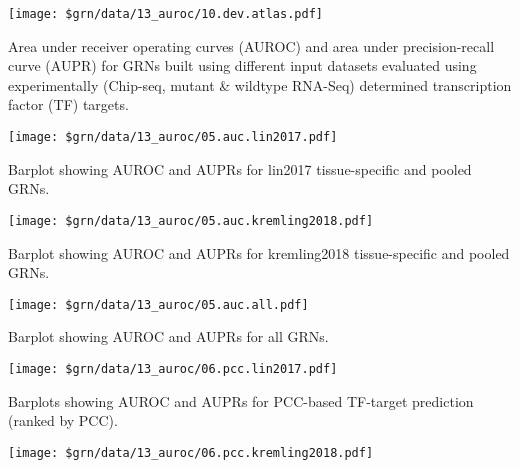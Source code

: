 \documentclass[11pt,]{article}
\let\origfigure\figure
\let\endorigfigure\endfigure
\renewenvironment{figure}[1][2] {
    \expandafter\origfigure\expandafter[H]
} {
    \endorigfigure
}
\begin{document}
\pagebreak

\begin{figure}
\centering
\texttt{[image: \$grn/data/13\_auroc/10.dev.atlas.pdf]}
\caption{Fig 1}
\end{figure}

Area under receiver operating curves (AUROC) and area under
precision-recall curve (AUPR) for GRNs built using different input
datasets evaluated using experimentally (Chip-seq, mutant \& wildtype
RNA-Seq) determined transcription factor (TF) targets.

\pagebreak

\begin{figure}
\centering
\texttt{[image: \$grn/data/13\_auroc/05.auc.lin2017.pdf]}
\caption{Fig 2}
\end{figure}

Barplot showing AUROC and AUPRs for lin2017 tissue-specific and pooled
GRNs.

\pagebreak

\begin{figure}
\centering
\texttt{[image: \$grn/data/13\_auroc/05.auc.kremling2018.pdf]}
\caption{Fig 3}
\end{figure}

Barplot showing AUROC and AUPRs for kremling2018 tissue-specific and
pooled GRNs.

\pagebreak

\begin{figure}
\centering
\texttt{[image: \$grn/data/13\_auroc/05.auc.all.pdf]}
\caption{Fig 4}
\end{figure}

Barplot showing AUROC and AUPRs for all GRNs.

\pagebreak

\begin{figure}
\centering
\texttt{[image: \$grn/data/13\_auroc/06.pcc.lin2017.pdf]}
\caption{Fig 5}
\end{figure}

Barplots showing AUROC and AUPRs for PCC-based TF-target prediction
(ranked by PCC).

\pagebreak

\begin{figure}
\centering
\texttt{[image: \$grn/data/13\_auroc/06.pcc.kremling2018.pdf]}
\caption{Fig 6}
\end{figure}
\end{document}
